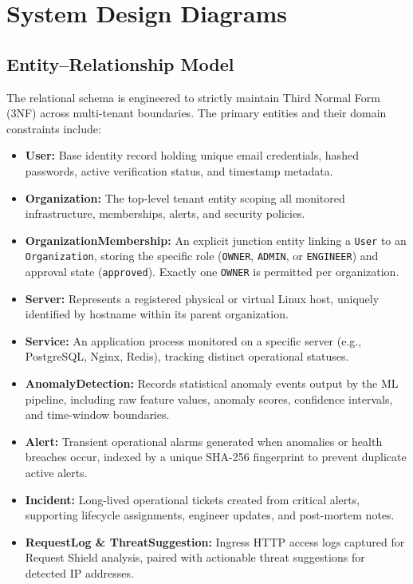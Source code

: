 \section{System Design Diagrams}

\subsection{Entity--Relationship Model}
The relational schema is engineered to strictly maintain Third Normal Form (3NF) across multi-tenant boundaries. The primary entities and their domain constraints include:

\begin{itemize}
  \item \textbf{User:} Base identity record holding unique email credentials, hashed passwords, active verification status, and timestamp metadata.
  \item \textbf{Organization:} The top-level tenant entity scoping all monitored infrastructure, memberships, alerts, and security policies.
  \item \textbf{OrganizationMembership:} An explicit junction entity linking a \texttt{User} to an \texttt{Organization}, storing the specific role (\texttt{OWNER}, \texttt{ADMIN}, or \texttt{ENGINEER}) and approval state (\texttt{approved}). Exactly one \texttt{OWNER} is permitted per organization.
  \item \textbf{Server:} Represents a registered physical or virtual Linux host, uniquely identified by hostname within its parent organization.
  \item \textbf{Service:} An application process monitored on a specific server (e.g., PostgreSQL, Nginx, Redis), tracking distinct operational statuses.
  \item \textbf{AnomalyDetection:} Records statistical anomaly events output by the ML pipeline, including raw feature values, anomaly scores, confidence intervals, and time-window boundaries.
  \item \textbf{Alert:} Transient operational alarms generated when anomalies or health breaches occur, indexed by a unique SHA-256 fingerprint to prevent duplicate active alerts.
  \item \textbf{Incident:} Long-lived operational tickets created from critical alerts, supporting lifecycle assignments, engineer updates, and post-mortem notes.
  \item \textbf{RequestLog \& ThreatSuggestion:} Ingress HTTP access logs captured for Request Shield analysis, paired with actionable threat suggestions for detected IP addresses.
\end{itemize}

